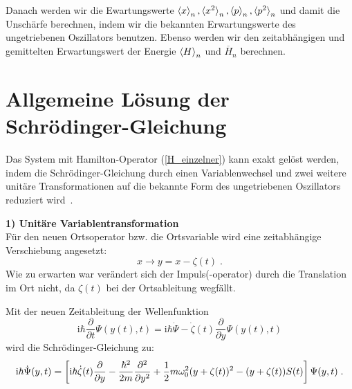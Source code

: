       Danach werden wir die Ewartungswerte $\braket{x}_n,\braket{x^2}_n,\braket{p}_n,\braket{p^2}_n$ und damit die Unschärfe berechnen, indem wir die bekannten Erwartungswerte des ungetriebenen Oszillators benutzen.
      Ebenso werden wir den zeitabhängigen und gemittelten Erwartungswert der Energie $\braket{H}_n$ und $\overline H_n$ berechnen.
\fi


    \section{Allgemeine Lösung der Schrödinger-Gleichung}
      \label{lsg_einzelner}
      Das System mit Hamilton-Operator (\ref{H_einzelner}) kann exakt gelöst werden, indem die Schrödinger-Gleichung durch einen Variablenwechsel und zwei weitere unitäre Transformationen auf die bekannte Form des ungetriebenen Oszillators reduziert wird~\cite{haengi}.

      \textbf{1) Unitäre Variablentransformation}\\
      Für den neuen Ortsoperator bzw. die Ortsvariable wird eine zeitabhängige Verschiebung angesetzt:
      \begin{equation}
        x \rightarrow y=x-\zeta(t) \; .
      \end{equation}
      Wie zu erwarten war verändert sich der Impuls(-operator) durch die Translation im Ort nicht, da $\zeta(t)$ bei der Ortsableitung wegfällt.

      Mit der neuen Zeitableitung der Wellenfunktion
      \begin{equation}
        \text{i}\hbar \frac{\partial}{\partial t} \Psi(y(t),t) = \text{i}\hbar \dot{\Psi} -\dot \zeta(t)\frac{\partial}{\partial y}\Psi(y(t),t)
      \end{equation}
      wird die Schrödinger-Gleichung zu:
      \begin{equation}
        \text i \hbar \dot{\Psi}(y,t) = \left[\text i \hbar \dot \zeta(t)\frac{\partial}{\partial y}-\frac{\hbar^2}{2m}\frac{\partial^2}{\partial y^2}+\frac{1}{2}m\omega_0^2(y+\zeta(t))^2-(y+\zeta(t))S(t)\right]\Psi(y,t) \; .
        \label{schroedinger_einzeln_getrieben}
      \end{equation}

